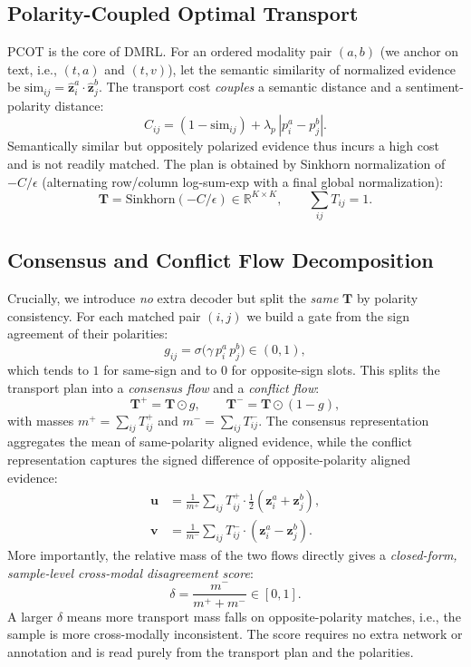 \documentclass[conference]{IEEEtran}
\begin{document}
\subsection{Polarity-Coupled Optimal Transport}
PCOT is the core of DMRL. For an ordered modality pair $(a,b)$ (we anchor on text,
i.e., $(t,a)$ and $(t,v)$), let the semantic similarity of normalized evidence be
$\mathrm{sim}_{ij} = \hat{\mathbf{z}}^{a}_i \cdot \hat{\mathbf{z}}^{b}_j$. The
transport cost \emph{couples} a semantic distance and a sentiment-polarity distance:
\begin{equation}
C_{ij} = (1-\mathrm{sim}_{ij}) + \lambda_p\,|p^a_i - p^b_j|.
\end{equation}
Semantically similar but oppositely polarized evidence thus incurs a high cost and
is not readily matched. The plan is obtained by Sinkhorn normalization of
$-C/\epsilon$ (alternating row/column log-sum-exp with a final global
normalization):
\begin{equation}
\mathbf{T} = \mathrm{Sinkhorn}\!\left(-C/\epsilon\right)\in\mathbb{R}^{K\times K},
\qquad \textstyle\sum_{ij}T_{ij}=1.
\end{equation}

\subsection{Consensus and Conflict Flow Decomposition}
Crucially, we introduce \emph{no} extra decoder but split the \emph{same}
$\mathbf{T}$ by polarity consistency. For each matched pair $(i,j)$ we build a gate
from the sign agreement of their polarities:
\begin{equation}
g_{ij} = \sigma\!\big(\gamma\, p^a_i\, p^b_j\big)\in(0,1),
\end{equation}
which tends to $1$ for same-sign and to $0$ for opposite-sign slots. This splits the
transport plan into a \emph{consensus flow} and a \emph{conflict flow}:
\begin{equation}
\mathbf{T}^{+} = \mathbf{T}\odot g, \qquad \mathbf{T}^{-} = \mathbf{T}\odot(1-g),
\end{equation}
with masses $m^{+}=\sum_{ij}T^{+}_{ij}$ and $m^{-}=\sum_{ij}T^{-}_{ij}$. The
consensus representation aggregates the mean of same-polarity aligned evidence,
while the conflict representation captures the signed difference of opposite-polarity
aligned evidence:
\begin{align}
\mathbf{u} &= \frac{1}{m^{+}}\sum_{ij}T^{+}_{ij}\cdot\tfrac{1}{2}(\mathbf{z}^a_i+\mathbf{z}^b_j),\\
\mathbf{v} &= \frac{1}{m^{-}}\sum_{ij}T^{-}_{ij}\cdot(\mathbf{z}^a_i-\mathbf{z}^b_j).
\end{align}
More importantly, the relative mass of the two flows directly gives a
\emph{closed-form, sample-level cross-modal disagreement score}:
\begin{equation}
\delta = \frac{m^{-}}{m^{+}+m^{-}}\in[0,1].
\end{equation}
A larger $\delta$ means more transport mass falls on opposite-polarity matches,
i.e., the sample is more cross-modally inconsistent. The score requires no extra
network or annotation and is read purely from the transport plan and the polarities.
\end{document}
